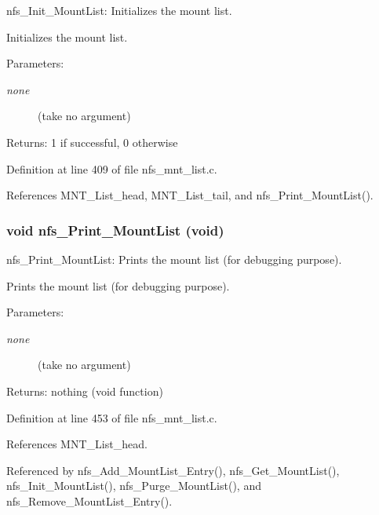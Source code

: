 nfs\_\-Init\_\-Mount\-List: Initializes the mount list.

Initializes the mount list.

\begin{Desc}
\item[Parameters:]
\begin{description}
\item[{\em none}](take no argument)\end{description}
\end{Desc}
\begin{Desc}
\item[Returns:]1 if successful, 0 otherwise \end{Desc}


Definition at line 409 of file nfs\_\-mnt\_\-list.c.

References MNT\_\-List\_\-head, MNT\_\-List\_\-tail, and nfs\_\-Print\_\-Mount\-List().
\subsubsection{\setlength{\rightskip}{0pt plus 5cm}void nfs\_\-Print\_\-Mount\-List (void)}\label{nfs__mnt__list_8c_a7}


nfs\_\-Print\_\-Mount\-List: Prints the mount list (for debugging purpose).

Prints the mount list (for debugging purpose).

\begin{Desc}
\item[Parameters:]
\begin{description}
\item[{\em none}](take no argument)\end{description}
\end{Desc}
\begin{Desc}
\item[Returns:]nothing (void function) \end{Desc}


Definition at line 453 of file nfs\_\-mnt\_\-list.c.

References MNT\_\-List\_\-head.

Referenced by nfs\_\-Add\_\-Mount\-List\_\-Entry(), nfs\_\-Get\_\-Mount\-List(), nfs\_\-Init\_\-Mount\-List(), nfs\_\-Purge\_\-Mount\-List(), and nfs\_\-Remove\_\-Mount\-List\_\-Entry().
